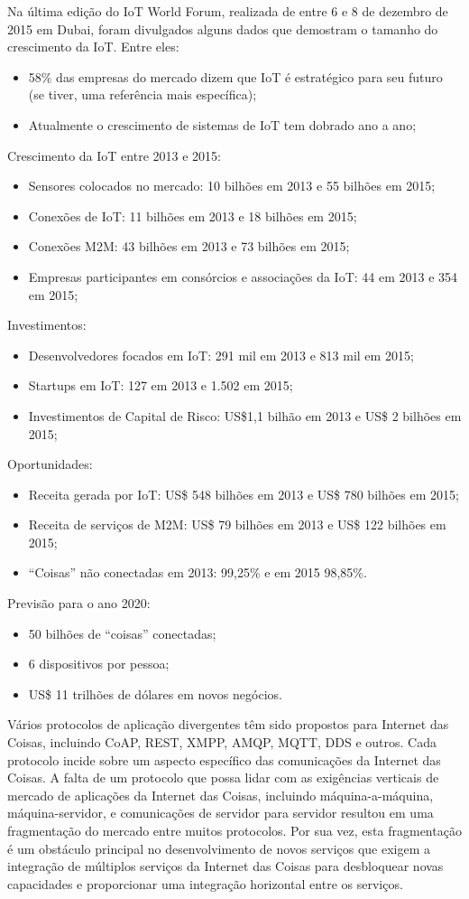 Na última edição do IoT World Forum, realizada de entre 6 e 8 de dezembro
de 2015 em Dubai\cite{url:computerworld:2015,url:webintel:2015,url:cisco:iot:2015},
foram divulgados alguns dados que demostram o tamanho do crescimento
da IoT. Entre eles:
\begin{itemize}
\item 58\% das empresas do mercado dizem que IoT é estratégico para seu
futuro (se tiver, uma referência mais específica); 
\item Atualmente o crescimento de sistemas de IoT tem dobrado ano a ano; 
\end{itemize}
Crescimento da IoT entre 2013 e 2015:
\begin{itemize}
\item Sensores colocados no mercado: 10 bilhões em 2013 e 55 bilhões em
2015; 
\item Conexões de IoT: 11 bilhões em 2013 e 18 bilhões em 2015; 
\item Conexões M2M: 43 bilhões em 2013 e 73 bilhões em 2015; 
\item Empresas participantes em consórcios e associações da IoT: 44 em 2013
e 354 em 2015;
\end{itemize}
Investimentos:
\begin{itemize}
\item Desenvolvedores focados em IoT: 291 mil em 2013 e 813 mil em 2015; 
\item Startups em IoT: 127 em 2013 e 1.502 em 2015;
\item Investimentos de Capital de Risco: US\$1,1 bilhão em 2013 e US\$ 2
bilhões em 2015;
\end{itemize}
Oportunidades:
\begin{itemize}
\item Receita gerada por IoT: US\$ 548 bilhões em 2013 e US\$ 780 bilhões
em 2015; 
\item Receita de serviços de M2M: US\$ 79 bilhões em 2013 e US\$ 122 bilhões
em 2015;
\item “Coisas” não conectadas em 2013: 99,25\% e em 2015 98,85\%.
\end{itemize}
Previsão para o ano 2020:
\begin{itemize}
\item 50 bilhões de “coisas” conectadas; 
\item 6 dispositivos por pessoa;
\item US\$ 11 trilhões de dólares em novos negócios. 
\end{itemize}
Vários protocolos de aplicação divergentes têm sido propostos para
Internet das Coisas, incluindo CoAP, REST, XMPP, AMQP, MQTT, DDS e
outros. Cada protocolo incide sobre um aspecto específico das comunicações
da Internet das Coisas. A falta de um protocolo que possa lidar com
as exigências verticais de mercado de aplicações da Internet das Coisas,
incluindo máquina-a-máquina, máquina-servidor, e comunicações de servidor
para servidor resultou em uma fragmentação do mercado entre muitos
protocolos. Por sua vez, esta fragmentação é um obstáculo principal
no desenvolvimento de novos serviços que exigem a integração de múltiplos
serviços da Internet das Coisas para desbloquear novas capacidades
e proporcionar uma integração horizontal entre os serviços.

